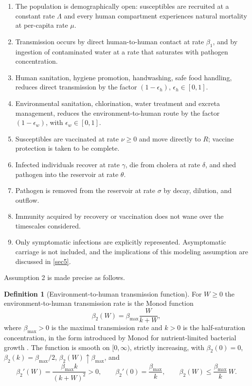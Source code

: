 \documentclass[11pt]{article}
\theoremstyle{plain}
\theoremstyle{definition}
\newtheorem{definition}[theorem]{Definition}
\theoremstyle{remark}
\begin{document}
\begin{enumerate}
\item The population is demographically open: susceptibles are recruited at a constant rate $\Lambda$ and every human compartment experiences natural mortality at per-capita rate $\mu$.
\item Transmission occurs by direct human-to-human contact at rate $\beta_1$, and by ingestion of contaminated water at a rate that saturates with pathogen concentration.
\item Human sanitation, hygiene promotion, handwashing, safe food handling, reduces direct transmission by the factor $(1-\epsilon_h)$, $\epsilon_h\in[0,1]$.
\item Environmental sanitation, chlorination, water treatment and excreta management, reduces the environment-to-human route by the factor $(1-\epsilon_w)$, with $\epsilon_w\in[0,1]$.
\item Susceptibles are vaccinated at rate $\nu\ge0$ and move directly to $R$; vaccine protection is taken to be complete.
\item Infected individuals recover at rate $\gamma$, die from cholera at rate $\delta$, and shed pathogen into the reservoir at rate $\theta$.
\item Pathogen is removed from the reservoir at rate $\sigma$ by decay, dilution, and outflow.
\item Immunity acquired by recovery or vaccination does not wane over the timescales considered.
\item Only symptomatic infections are explicitly represented. Asymptomatic carriage is not included, and the implications of this modeling assumption are discussed in \cref{sec5}.
\end{enumerate}

Assumption 2 is made precise as follows.

\begin{definition}[Environment-to-human transmission function]\label{def:monod}
For $W\ge0$ the environment-to-human transmission rate is the Monod function
\begin{equation}\label{eq:monod}
\beta_2(W)=\beta_{\max}\frac{W}{k+W},
\end{equation}
where $\beta_{\max}>0$ is the maximal transmission rate and $k>0$ is the half-saturation concentration, in the form introduced by Monod for nutrient-limited bacterial growth \cite{Monod1949}. The function is smooth on $[0,\infty)$, strictly increasing, with $\beta_2(0)=0$, $\beta_2(k)=\beta_{\max}/2$, $\beta_2(W)\uparrow\beta_{\max}$, and
\begin{equation}\label{eq:monod_props}
\beta_2'(W)=\frac{\beta_{\max}k}{(k+W)^2}>0,\qquad \beta_2'(0)=\frac{\beta_{\max}}{k},\qquad \beta_2(W)\le \frac{\beta_{\max}}{k}\,W .
\end{equation}
\end{definition}
\end{document}
